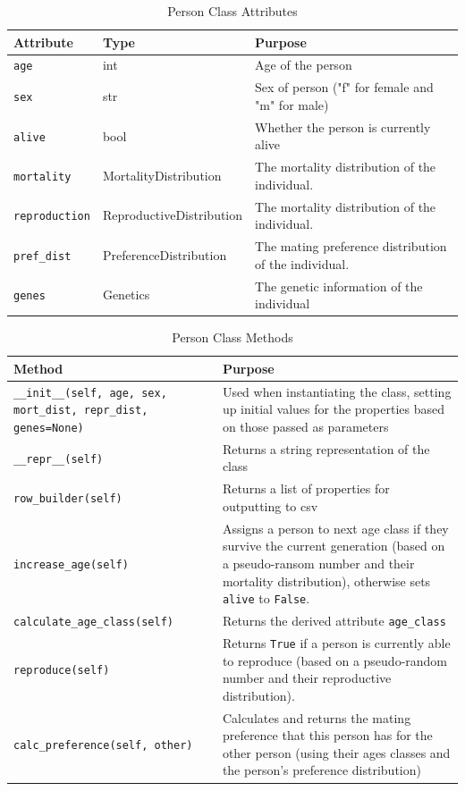 \documentclass[authoryearcitations]{UoYCSproject}
\begin{document}
\begin{table}[h]
\caption{Person Class Attributes}
\label{tbl:personAttributes}
\begin{tabular}{l l m{5cm}}
\textbf{Attribute} & \textbf{Type} & \textbf{Purpose} \\\hline
\texttt{age} & int & Age of the person \\\hline
\texttt{sex} & str & Sex of person ("f" for female and "m" for male) \\\hline
\texttt{alive} & bool & Whether the person is currently alive \\\hline
\texttt{mortality} & MortalityDistribution & The mortality distribution of the individual. \\\hline
\texttt{reproduction} & ReproductiveDistribution & The mortality distribution of the individual. \\\hline
\texttt{pref\_dist} & PreferenceDistribution & The mating preference distribution of the individual. \\\hline 
\texttt{genes} & Genetics & The genetic information of the individual
\end{tabular}
\end{table}

\begin{table}[h]
\caption{Person Class Methods}
\label{tbl:personMethods}
\begin{tabular}{m{} m{}}
\textbf{Method} & \textbf{Purpose} \\\hline
\texttt{\_\_init\_\_(self, age, sex, mort\_dist, repr\_dist, genes=None)} & Used when instantiating the class, setting up initial values for the properties based on those passed as parameters\\\hline
\texttt{\_\_repr\_\_(self)} & Returns a string representation of the class \\\hline
\texttt{row\_builder(self)} & Returns a list of properties for outputting to csv\\\hline
\texttt{increase\_age(self)} & Assigns a person to next age class if they survive the current generation (based on a pseudo-ransom number and their mortality distribution), otherwise sets \texttt{alive} to \texttt{False}.\\\hline
\texttt{calculate\_age\_class(self)} & Returns the derived attribute \texttt{age\_class} \\\hline
\texttt{reproduce(self)} & Returns \texttt{True} if a person is currently able to reproduce (based on a pseudo-random number and their reproductive distribution). \\\hline
\texttt{calc\_preference(self, other)} & Calculates and returns the mating preference that this person has for the other person (using their ages classes and the person's preference distribution) \\\hline
\end{tabular}
\end{table}
\end{document}
